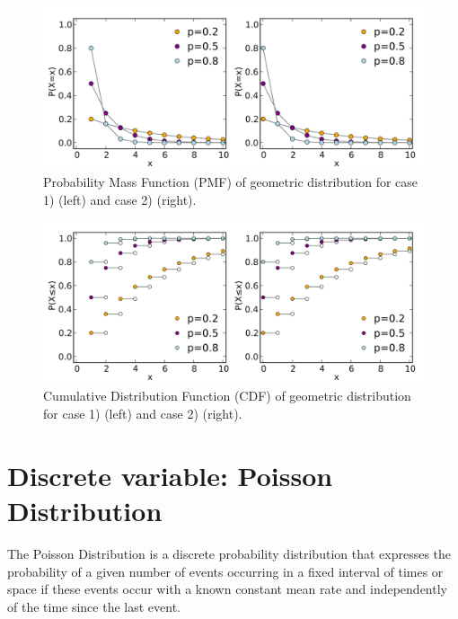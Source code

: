 \begin{figure}[h!]
\begin{center}
	\includegraphics[scale=0.09]{geometric_pmf.png}
	\caption[]{Probability Mass Function (PMF) of geometric distribution for case 1) (left) and case 2) (right).}
	\label{fairdiepmf}
	\end{center}
	\end{figure}
	
\begin{figure}[h!]
\begin{center}
	\includegraphics[scale=0.09]{geometric_cdf.png}
	\caption[]{Cumulative Distribution Function (CDF) of geometric distribution for case 1) (left) and case 2) (right).}
	\label{fairdiepmf}
	\end{center}
	\end{figure}

\section{Discrete variable: Poisson Distribution}

The Poisson Distribution is a discrete probability distribution that expresses the probability of a given number of events occurring in a fixed interval of times or space if these events occur with a known constant mean rate and independently of the time since the last event. \\

